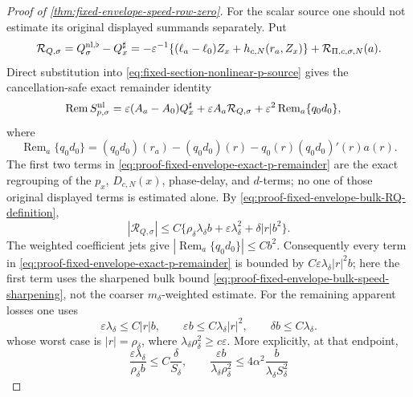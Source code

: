 \begin{proof}[Proof of
\cref{thm:fixed-envelope-speed-row-zero}]
For the scalar source one should not estimate its original displayed
summands separately.  Put
\begin{equation}
 \mathcal R_{Q,\sigma}
 =Q_\sigma^{\rm nl,\flat}-Q_x^\sharp
 =-\varepsilon^{-1}
   \{(\ell_a-\ell_0)Z_x+h_{c,N}(r_a,Z_x)\}
       +\mathcal R_{\Pi,c,\sigma,N}(a).           \label{eq:proof-fixed-envelope-bulk-RQ-definition}
\end{equation}
Direct substitution into
\cref{eq:fixed-section-nonlinear-p-source} gives the cancellation-safe
exact remainder identity
\begin{align}
 \operatorname{Rem}S_{p,\sigma}^{\rm nl}
={}&\varepsilon(A_a-A_0)Q_x^\sharp
   +\varepsilon A_a\mathcal R_{Q,\sigma}
   +\varepsilon^2\operatorname{Rem}_{a}
       \{q_0d_0\},                               \label{eq:proof-fixed-envelope-exact-p-remainder}
\end{align}
where
\[
 \operatorname{Rem}_{a}\{q_0d_0\}
 =(q_0d_0)(r_a)-(q_0d_0)(r)
       -q_0(r)(q_0d_0)'(r)a(r).
\]
The first two terms in
\cref{eq:proof-fixed-envelope-exact-p-remainder} are the exact regrouping
of the \(p_x\), \(D_{c,N}(x)\), phase-delay, and \(d\)-terms; no one of
those original displayed terms is estimated alone.  By
\cref{eq:proof-fixed-envelope-bulk-RQ-definition},
\begin{equation}
 |\mathcal R_{Q,\sigma}|
 \le C\{\rho_\delta\lambda_\delta b
       +\varepsilon\lambda_\delta^2
       +\delta|r|b^2\}.                          \label{eq:proof-fixed-envelope-bulk-speed-remainder}
\end{equation}
The weighted coefficient jets give
\(|\operatorname{Rem}_{a}\{q_0d_0\}|\le Cb^2\).
Consequently every term in
\cref{eq:proof-fixed-envelope-exact-p-remainder} is bounded by
\(C\varepsilon\lambda_\delta|r|^2b\); here the first term uses the
sharpened bulk bound
\cref{eq:proof-fixed-envelope-bulk-speed-sharpening}, not the coarser
\(m_\delta\)-weighted estimate.  For the remaining apparent losses one uses
\begin{equation}
 \varepsilon\lambda_\delta\le C|r|b,\qquad
 \varepsilon b\le C\lambda_\delta|r|^2,\qquad
 \delta b\le C\lambda_\delta.                    \label{eq:proof-fixed-envelope-bulk-closing-scales}
\end{equation}
whose worst case is \(|r|=\rho_\delta\), where
\(\lambda_\delta\rho_\delta^2\ge c\varepsilon\).  More explicitly, at
that endpoint,
\[
 \frac{\varepsilon\lambda_\delta}{\rho_\delta b}
 \le C\frac{\delta}{S_\delta},\qquad
 \frac{\varepsilon b}{\lambda_\delta\rho_\delta^2}
 \le 4\alpha^2\frac{b}{\lambda_\delta S_\delta^2}
\]
\end{proof}
